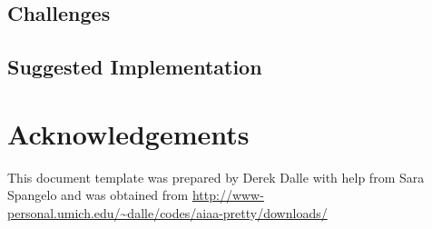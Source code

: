 \documentclass{aer1315-pretty}
\begin{document}
\subsection{Challenges} \label{ssec:challenges}





\subsection{Suggested Implementation} \label{ssec:implementation}  

                       
%


\section*{Acknowledgements}
This document template was prepared by Derek Dalle with help from Sara Spangelo and was obtained from \url{http://www-personal.umich.edu/~dalle/codes/aiaa-pretty/downloads/}  



\end{document}
